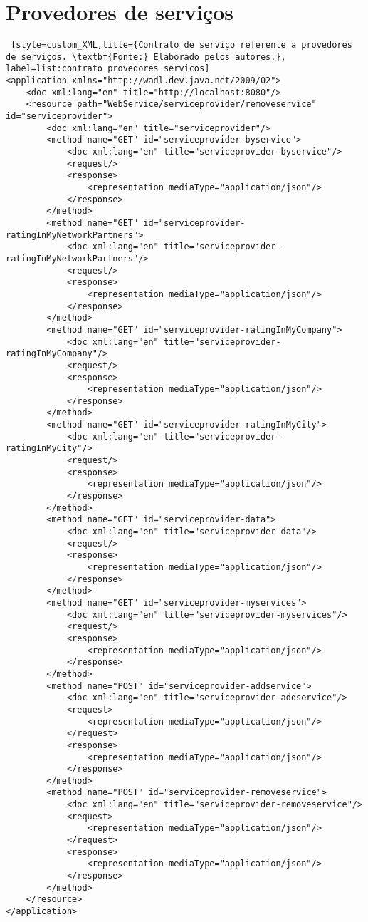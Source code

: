 \section*{Provedores de serviços}

\begin{lstlisting} [style=custom_XML,title={Contrato de serviço referente a provedores de serviços. \textbf{Fonte:} Elaborado pelos autores.}, label=list:contrato_provedores_servicos] 	
<application xmlns="http://wadl.dev.java.net/2009/02">
	<doc xml:lang="en" title="http://localhost:8080"/>
	<resource path="WebService/serviceprovider/removeservice" id="serviceprovider">
		<doc xml:lang="en" title="serviceprovider"/>
		<method name="GET" id="serviceprovider-byservice">
			<doc xml:lang="en" title="serviceprovider-byservice"/>
			<request/>
			<response>
				<representation mediaType="application/json"/>
			</response>
		</method>
		<method name="GET" id="serviceprovider-ratingInMyNetworkPartners">
			<doc xml:lang="en" title="serviceprovider-ratingInMyNetworkPartners"/>
			<request/>
			<response>
				<representation mediaType="application/json"/>
			</response>
		</method>
		<method name="GET" id="serviceprovider-ratingInMyCompany">
			<doc xml:lang="en" title="serviceprovider-ratingInMyCompany"/>
			<request/>
			<response>
				<representation mediaType="application/json"/>
			</response>
		</method>
		<method name="GET" id="serviceprovider-ratingInMyCity">
			<doc xml:lang="en" title="serviceprovider-ratingInMyCity"/>
			<request/>
			<response>
				<representation mediaType="application/json"/>
			</response>
		</method>
		<method name="GET" id="serviceprovider-data">
			<doc xml:lang="en" title="serviceprovider-data"/>
			<request/>
			<response>
				<representation mediaType="application/json"/>
			</response>
		</method>
		<method name="GET" id="serviceprovider-myservices">
			<doc xml:lang="en" title="serviceprovider-myservices"/>
			<request/>
			<response>
				<representation mediaType="application/json"/>
			</response>
		</method>
		<method name="POST" id="serviceprovider-addservice">
			<doc xml:lang="en" title="serviceprovider-addservice"/>
			<request>
				<representation mediaType="application/json"/>
			</request>
			<response>
				<representation mediaType="application/json"/>
			</response>
		</method>
		<method name="POST" id="serviceprovider-removeservice">
			<doc xml:lang="en" title="serviceprovider-removeservice"/>
			<request>
				<representation mediaType="application/json"/>
			</request>
			<response>
				<representation mediaType="application/json"/>
			</response>
		</method>
	</resource>
</application>
\end{lstlisting}

